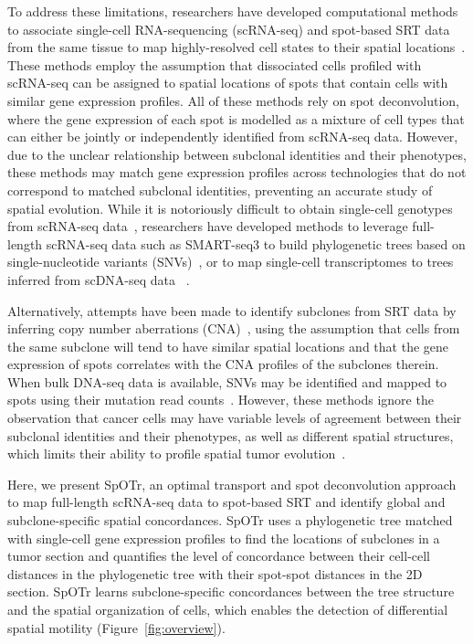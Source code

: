 \documentclass{article}
\newcommand{\toolname}{SpOTr}
\newcommand{\toolnamex}{SpOTr }
\begin{document}
To address these limitations, researchers have developed computational methods to associate single-cell RNA-sequencing (scRNA-seq) and spot-based SRT data from the same tissue to map highly-resolved cell states to their spatial locations~\cite{nguyen2024scdot, lopez2022destvi, kleshchevnikov2022cell2location}. These methods employ the assumption that dissociated cells profiled with scRNA-seq can be assigned to spatial locations of spots that contain cells with similar gene expression profiles. All of these methods rely on spot deconvolution, where the gene expression of each spot is modelled as a mixture of cell types that can either be jointly or independently identified from scRNA-seq data. However, due to the unclear relationship between subclonal identities and their phenotypes, these methods may match gene expression profiles across technologies that do not correspond to matched subclonal identities, preventing an accurate study of spatial evolution. While it is notoriously difficult to obtain single-cell genotypes from scRNA-seq data~\cite{fan2020single}, researchers have developed methods to leverage full-length scRNA-seq data such as SMART-seq3 to build phylogenetic trees based on single-nucleotide variants (SNVs)~\cite{zhou2020dendro, zimmermann2025phylogenetic}, or to map single-cell transcriptomes to trees inferred from scDNA-seq data~\cite{campbell2019clonealign, ferreira2022mapping} .

Alternatively, attempts have been made to identify subclones from SRT data by inferring copy number aberrations (CNA)~\cite{ma2024inferring, erickson2022spatially, elyanow2021starch}, using the assumption that cells from the same subclone will tend to have similar spatial locations and that the gene expression of spots correlates with the CNA profiles of the subclones therein. When bulk DNA-seq data is available, SNVs may be identified and mapped to spots using their mutation read counts~\cite{shafighi2024integrative}. However, these methods ignore the observation that cancer cells may have variable levels of agreement between their subclonal identities and their phenotypes, as well as different spatial structures, which limits their ability to profile spatial tumor evolution~\cite{whiting2024phenotypic, schiffman2024defining}. 

Here, we present \toolname, an optimal transport and spot deconvolution approach to map full-length scRNA-seq data to spot-based SRT and identify global and subclone-specific spatial concordances. \toolnamex uses a phylogenetic tree matched with single-cell gene expression profiles to find the locations of subclones in a tumor section and quantifies the level of concordance between their cell-cell distances in the phylogenetic tree with their spot-spot distances in the 2D section. \toolnamex learns subclone-specific concordances between the tree structure and the spatial organization of cells, which enables the detection of differential spatial motility  (Figure~\ref{fig:overview}).
\end{document}
